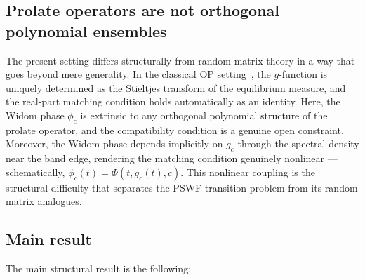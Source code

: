\documentclass[12pt,a4paper]{amsart}
\theoremstyle{definition}
\theoremstyle{remark}
\begin{document}
\subsection*{Prolate operators are not orthogonal polynomial ensembles}

The present setting differs structurally from random matrix theory
in a way that goes beyond mere generality.
In the classical OP setting~\cite{Deift1999}, the $g$-function is
uniquely determined as the Stieltjes transform of the equilibrium
measure, and the real-part matching condition holds automatically
as an identity.
Here, the Widom phase $\phi_c$ is extrinsic to any orthogonal
polynomial structure of the prolate operator, and the compatibility
condition is a genuine open constraint.
Moreover, the Widom phase depends implicitly on $g_c$ through the
spectral density near the band edge, rendering the matching condition
genuinely nonlinear --- schematically, $\phi_c(t) = \Phi(t, g_c(t), c)$.
This nonlinear coupling is the structural difficulty that separates
the PSWF transition problem from its random matrix analogues.

\subsection*{Main result}

The main structural result is the following:

\begin{center}
\end{center}
\end{document}
